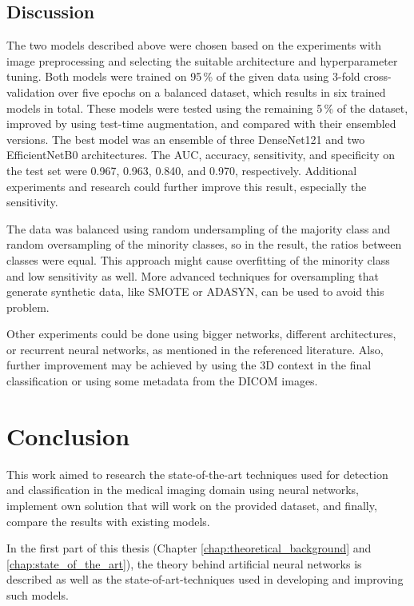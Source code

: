 \documentclass[thesis=B,english]{FITthesis}[2019/12/23]
\begin{document}
\section{Discussion}
The two models described above were chosen based on the experiments with image preprocessing and selecting the suitable architecture and hyperparameter tuning. Both models were trained on 95\,\% of the given data using 3-fold cross-validation over five epochs on a balanced dataset, which results in six trained models in total. These models were tested using the remaining 5\,\% of the dataset, improved by using test-time augmentation, and compared with their ensembled versions. The best model was an ensemble of three DenseNet121 and two EfficientNetB0 architectures. The AUC, accuracy, sensitivity, and specificity on the test set were 0.967, 0.963, 0.840, and 0.970, respectively. Additional experiments and research could further improve this result, especially the sensitivity. 

The data was balanced using random undersampling of the majority class and random oversampling of the minority classes, so in the result, the ratios between classes were equal. This approach might cause overfitting of the minority class and low sensitivity as well. More advanced techniques for oversampling that generate synthetic data,  like SMOTE\cite{chawla_bowyer_hall_kegelmeyer_2002} or ADASYN\cite{4633969}, can be used to avoid this problem.

Other experiments could be done using bigger networks, different architectures, or recurrent neural networks, as mentioned in the referenced literature. Also, further improvement may be achieved by using the 3D context in the final classification or using some metadata from the DICOM images.

\chapter{Conclusion}
This work aimed to research the state-of-the-art techniques used for detection and classification in the medical imaging domain using neural networks, implement own solution that will work on the provided dataset, and finally, compare the results with existing models. 

In the first part of this thesis (Chapter \ref{chap:theoretical_background} and \ref{chap:state_of_the_art}), the theory behind artificial neural networks is described as well as the state-of-art-techniques used in developing and improving such models.
\end{document}
